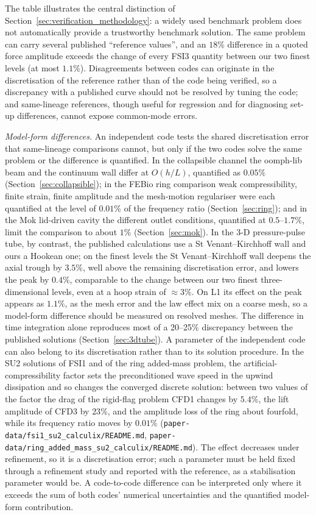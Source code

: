 The table illustrates the central distinction of Section~\ref{sec:verification_methodology}: a widely used benchmark problem does not automatically provide a trustworthy benchmark solution.
The same problem can carry several published ``reference values'', and an $18\%$ difference in a quoted force amplitude exceeds the change of every FSI3 quantity between our two finest levels (at most $1.1\%$).
Disagreements between codes can originate in the discretisation of the reference rather than of the code being verified, so a discrepancy with a published curve should not be resolved by tuning the code; and same-lineage references, though useful for regression and for diagnosing set-up differences, cannot expose common-mode errors.

\emph{Model-form differences.}
An independent code tests the shared discretisation error that same-lineage comparisons cannot, but only if the two codes solve the same problem or the difference is quantified.
In the collapsible channel the oomph-lib beam and the continuum wall differ at $O(h/L)$, quantified as $0.05\%$ (Section~\ref{sec:collapsible}); in the FEBio ring comparison weak compressibility, finite strain, finite amplitude and the mesh-motion regulariser were each quantified at the level of $0.01\%$ of the frequency ratio (Section~\ref{sec:ring}); and in the Mok lid-driven cavity the different outlet conditions, quantified at $0.5$--$1.7\%$, limit the comparison to about $1\%$ (Section~\ref{sec:mok}).
In the 3-D pressure-pulse tube, by contrast, the published calculations use a St Venant--Kirchhoff wall and ours a Hookean one; on the finest levels the St Venant--Kirchhoff wall deepens the axial trough by $3.5\%$, well above the remaining discretisation error, and lowers the peak by $0.4\%$, comparable to the change between our two finest three-dimensional levels, even at a hoop strain of $\approx3\%$. On L1 its effect on the peak appears as $1.1\%$, as the mesh error and the law effect mix on a coarse mesh, so a model-form difference should be measured on resolved meshes. The difference in time integration alone reproduces most of a 20--25\% discrepancy between the published solutions (Section~\ref{sec:3dtube}).
A parameter of the independent code can also belong to its discretisation rather than to its solution procedure.
In the SU2 solutions of FSI1 and of the ring added-mass problem, the artificial-compressibility factor sets the preconditioned wave speed in the upwind dissipation and so changes the converged discrete solution: between two values of the factor the drag of the rigid-flag problem CFD1 changes by $5.4\%$, the lift amplitude of CFD3 by $23\%$, and the amplitude loss of the ring about fourfold, while its frequency ratio moves by $0.01\%$ (\texttt{paper-data/fsi1\_su2\_calculix/README.md}, \texttt{paper-data/ring\_added\_mass\_su2\_calculix/README.md}).
The effect decreases under refinement, so it is a discretisation error; such a parameter must be held fixed through a refinement study and reported with the reference, as a stabilisation parameter would be.
A code-to-code difference can be interpreted only where it exceeds the sum of both codes' numerical uncertainties and the quantified model-form contribution.

